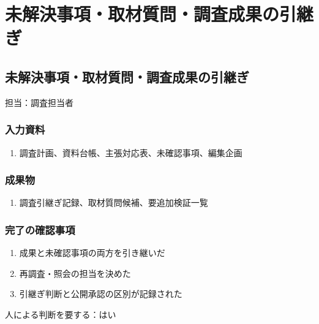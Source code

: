 \documentclass[a4paper,11pt]{article}
\begin{document}
\section{未解決事項・取材質問・調査成果の引継ぎ}
\subsection{未解決事項・取材質問・調査成果の引継ぎ}
\par 担当：調査担当者\par\medskip
\subsubsection*{入力資料}
\begin{enumerate}[leftmargin=2em,itemsep=0.35em]
\item 調査計画、資料台帳、主張対応表、未確認事項、編集企画
\end{enumerate}
\subsubsection*{成果物}
\begin{enumerate}[leftmargin=2em,itemsep=0.35em]
\item 調査引継ぎ記録、取材質問候補、要追加検証一覧
\end{enumerate}
\subsubsection*{完了の確認事項}
\begin{enumerate}[leftmargin=2em,itemsep=0.35em]
\item 成果と未確認事項の両方を引き継いだ
\item 再調査・照会の担当を決めた
\item 引継ぎ判断と公開承認の区別が記録された
\end{enumerate}
\par 人による判断を要する：はい\par\medskip
\end{document}

